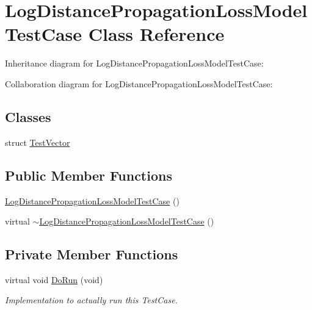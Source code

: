 \hypertarget{classLogDistancePropagationLossModelTestCase}{}\section{Log\+Distance\+Propagation\+Loss\+Model\+Test\+Case Class Reference}
\label{classLogDistancePropagationLossModelTestCase}


Inheritance diagram for Log\+Distance\+Propagation\+Loss\+Model\+Test\+Case\+:


Collaboration diagram for Log\+Distance\+Propagation\+Loss\+Model\+Test\+Case\+:
\subsection*{Classes}
\begin{DoxyCompactItemize}
\item 
struct \hyperlink{structLogDistancePropagationLossModelTestCase_1_1TestVector}{Test\+Vector}
\end{DoxyCompactItemize}
\subsection*{Public Member Functions}
\begin{DoxyCompactItemize}
\item 
\hyperlink{classLogDistancePropagationLossModelTestCase_af4eca244fed46547074069cebf9bbbc2}{Log\+Distance\+Propagation\+Loss\+Model\+Test\+Case} ()
\item 
virtual \hyperlink{classLogDistancePropagationLossModelTestCase_aab89528b65877690acc7c7ff75b598d5}{$\sim$\+Log\+Distance\+Propagation\+Loss\+Model\+Test\+Case} ()
\end{DoxyCompactItemize}
\subsection*{Private Member Functions}
\begin{DoxyCompactItemize}
\item 
virtual void \hyperlink{classLogDistancePropagationLossModelTestCase_a25ff5690736a22d0454da11e0bcfc0e6}{Do\+Run} (void)
\begin{DoxyCompactList}\small\item\em Implementation to actually run this Test\+Case. \end{DoxyCompactList}\end{DoxyCompactItemize}
